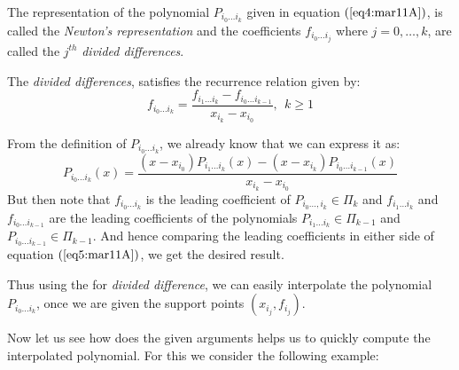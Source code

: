 \begin{defn}\label{defn1:mar11A}
    The representation of the polynomial $P_{i_0 \dots i_k}$ given in equation $(\ref{eq4:mar11A})$, is called the \textit{Newton's representation} and the coefficients $f_{i_0 \dots i_j}$ where $j = 0, \dots, k$, are called the $j^{th}$ \textit{divided differences}.
\end{defn}

\begin{thm}\label{thm1:mar11A}
    The \textit{divided differences}, satisfies the recurrence relation given by:
    \[
        f_{i_0 \dots i_k} = \frac{f_{i_1 \dots i_k} - f_{i_0 \dots i_{k-1}}}{x_{i_k} - x_{i_0}}, \ \ k \geq 1  
    \]
\end{thm}
\begin{prf}
    From the definition of $P_{i_0\dots i_k}$, we already know that we can express it as: 
    \begin{equation}\label{eq5:mar11A}
        P_{i_0\dots i_k}(x) = \frac{(x-x_{i_0})P_{i_1\dots i_k}(x) - (x-x_{i_k})P_{i_0\dots i_{k-1}}(x)}{x_{i_k} - x_{i_0}} 
    \end{equation}
    But then note that $f_{i_0\dots i_k}$ is the leading coefficient of $P_{i_0\dots, i_k} \in \Pi_k$ and $f_{i_1\dots i_k}$ and $f_{i_0\dots i_{k-1}}$ are the leading coefficients of the polynomials $P_{i_1 \dots i_k} \in \Pi_{k-1}$ and $P_{i_0\dots i_{k-1}} \in \Pi_{k-1}$. And hence comparing the leading coefficients in either side of equation $(\ref{eq5:mar11A})$, we get the desired result.
\end{prf}

Thus using the  for \textit{divided difference}, we can easily interpolate the polynomial $P_{i_0\dots i_k}$, once we are given the support points $(x_{i_j}, f_{i_j})$. 

Now let us see how does the given arguments helps us to quickly compute the interpolated polynomial. For this we consider the following example:

